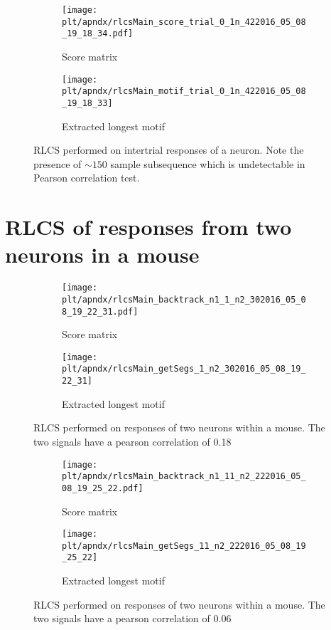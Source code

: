 \documentclass[MTech]{iitmdiss}
\newcommand{\plt}{thesis_plots}
\begin{document}
\begin{figure}[h]
  \begin{subfigure}[b]{0.5\textwidth}
    \texttt{[image: \\plt/apndx/rlcsMain\_score\_trial\_0\_1n\_422016\_05\_08\_19\_18\_34.pdf]}
    \caption{Score matrix}
  \end{subfigure}%
  \begin{subfigure}[b]{0.5\textwidth}
    \texttt{[image: \\plt/apndx/rlcsMain\_motif\_trial\_0\_1n\_422016\_05\_08\_19\_18\_33]}
    \caption{Extracted longest motif}
  \end{subfigure}%
  \caption{RLCS performed on intertrial responses of a neuron. Note the presence of $\sim 150$ sample subsequence which is undetectable in Pearson correlation test.}
  \label{fig:}
\end{figure}

\FloatBarrier
\section{RLCS of responses from two neurons in a mouse} %
\label{sec:rlcs_of_responses_from_two_neurons_in_a_mouse}
\begin{figure}[h]
  \begin{subfigure}[b]{0.5\textwidth}
    \texttt{[image: \\plt/apndx/rlcsMain\_backtrack\_n1\_1\_n2\_302016\_05\_08\_19\_22\_31.pdf]}
    \caption{Score matrix}
  \end{subfigure}%
  \begin{subfigure}[b]{0.5\textwidth}
    \texttt{[image: \\plt/apndx/rlcsMain\_getSegs\_1\_n2\_302016\_05\_08\_19\_22\_31]}
    \caption{Extracted longest motif}
  \end{subfigure}%
  \caption{RLCS performed on responses of two neurons within a mouse. The two signals have a pearson correlation of 0.18}
  \label{fig:}
\end{figure}

\begin{figure}[h]
  \begin{subfigure}[b]{0.5\textwidth}
    \texttt{[image: \\plt/apndx/rlcsMain\_backtrack\_n1\_11\_n2\_222016\_05\_08\_19\_25\_22.pdf]}
    \caption{Score matrix}
  \end{subfigure}%
  \begin{subfigure}[b]{0.5\textwidth}
    \texttt{[image: \\plt/apndx/rlcsMain\_getSegs\_11\_n2\_222016\_05\_08\_19\_25\_22]}
    \caption{Extracted longest motif}
  \end{subfigure}%
  \caption{RLCS performed on responses of two neurons within a mouse. The two signals have a pearson correlation of 0.06}
  \label{fig:}
\end{figure}
\end{document}
